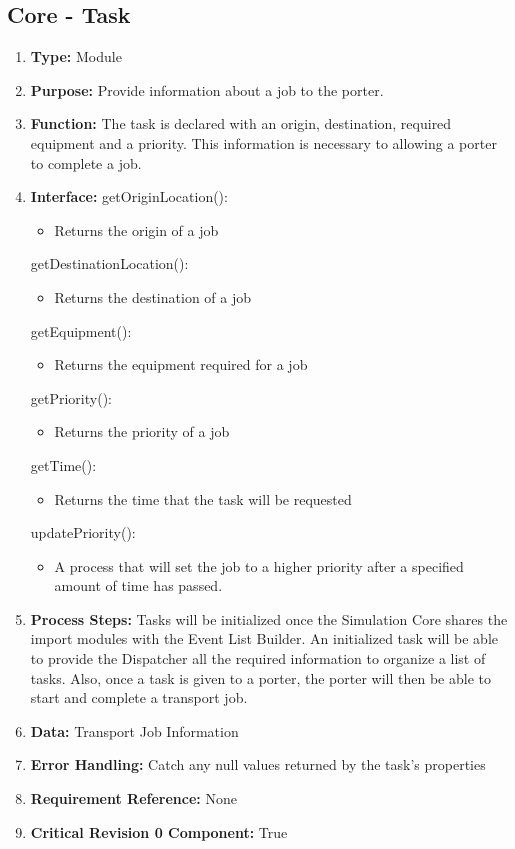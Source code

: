 \documentclass[paper=letter, fontsize=10pt]{scrartcl}
\numberwithin{equation}{section}		%
\numberwithin{figure}{section}			%
\numberwithin{table}{section}				%
\begin{document}
\subsection{Core - Task}
\begin{enumerate}[]
	\item \textbf{Type:} Module
	\item \textbf{Purpose:} Provide information about a job to the porter.
	\item \textbf{Function:} The task is declared with an origin, destination, required equipment and a priority.  This information is necessary to allowing a porter to complete a job.
	\item \textbf{Interface:} \newline
		getOriginLocation():
			\begin{itemize}
				\item Returns the origin of a job
			\end{itemize}
		getDestinationLocation():
			\begin{itemize}
				\item Returns the destination of a job
			\end{itemize}
		getEquipment():
			\begin{itemize}
				\item Returns the equipment required for a job
			\end{itemize}
		getPriority():
			\begin{itemize}
				\item Returns the priority of a job
			\end{itemize}
		getTime():
			\begin{itemize}
				\item Returns the time that the task will be requested
			\end{itemize}			
		updatePriority():
			\begin{itemize}
				\item A process that will set the job to a higher priority after a specified amount of time has passed.
			\end{itemize}
	\item \textbf{Process Steps:}  Tasks will be initialized once the Simulation Core shares the import modules with the Event List Builder.  An initialized task will be able to provide the Dispatcher all the required information to organize a list of tasks.  Also, once a task is given to a porter, the porter will then be able to start and complete a transport job.
	\item \textbf{Data:} Transport Job Information
	\item \textbf{Error Handling:} Catch any null values returned by the task's properties
	\item \textbf{Requirement Reference:} None
	\item \textbf{Critical Revision 0 Component:} True
\end{enumerate}
\end{document}
